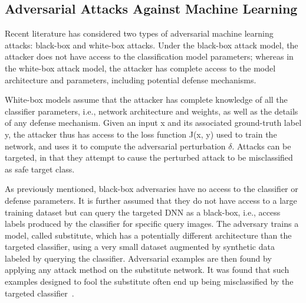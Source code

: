 


\subsection{Adversarial Attacks Against Machine Learning}

Recent literature has considered two types of adversarial machine learning attacks: black-box and white-box attacks. Under the black-box attack model, the attacker does not have access to the classification model parameters; whereas in the white-box attack model, the attacker has complete access to the model architecture and parameters, including potential defense mechanisms.



White-box models assume that the attacker has complete knowledge of all the classifier parameters, i.e., network architecture and weights, as well as the details of any defense mechanism. Given an input x and its associated ground-truth label y, the attacker thus has access to the loss function J(x, y) used to train the network, and uses it to compute the adversarial perturbation $\delta$. Attacks can be targeted, in that they attempt to cause the perturbed attack to be misclassified as safe target class. 

As previously mentioned, black-box adversaries have no access to the classifier
or defense parameters. It is further assumed that they do not have access to a large training dataset
but can query the targeted DNN as a black-box, i.e., access labels produced by the classifier for
specific query images. The adversary trains a model, called substitute, which has a potentially
different architecture than the targeted classifier, using a very small dataset augmented by synthetic
data labeled by querying the classifier. Adversarial examples are then found by applying any
attack method on the substitute network. It was found that such examples designed to fool the substitute often end up being misclassified by the targeted classifier~\cite{szegedy2014going, papernot2017practical}. 

